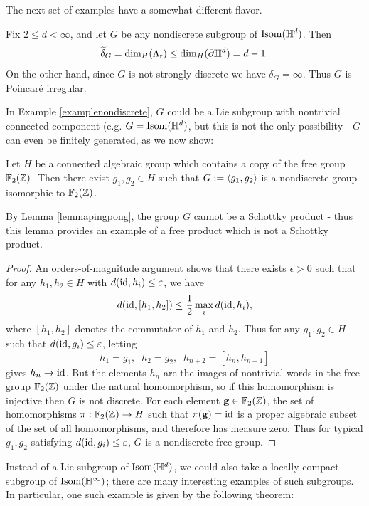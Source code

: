 The next set of examples have a somewhat different flavor.

\begin{example}
\label{examplenondiscrete}
Fix $2\leq d < \infty$, and let $G$ be any nondiscrete subgroup of $\Isom(\H^d)$. Then 
\[
\w\delta_G = \HD(\Lr) \leq \HD(\del\H^d) = d - 1.
\] 
On the other hand, since $G$ is not strongly discrete we have $\delta_G = \infty$. Thus $G$ is Poincar\'e irregular.
\end{example}

In Example \ref{examplenondiscrete}, $G$ could be a Lie subgroup with nontrivial connected component (e.g. $G = \Isom(\H^d)$, but this is not the only possibility - $G$ can even be finitely generated, as we now show:

\begin{lemma}
\label{lemmafreenotschottky}
Let $H$ be a connected algebraic group which contains a copy of the free group $\F_2(\Z)$. Then there exist $g_1,g_2\in H$ such that $G := \langle g_1,g_2\rangle$ is a nondiscrete group isomorphic to $\F_2(\Z)$.
\end{lemma}
By Lemma \ref{lemmapingpong}, the group $G$ cannot be a Schottky product - thus this lemma provides an example of a free product which is not a Schottky product.
\begin{proof}
An orders-of-magnitude argument shows that there exists $\epsilon > 0$ such that for any $h_1,h_2\in H$ with $d(\mathrm{id},h_i)\leq \varepsilon$, we have $$d(\mathrm{id},[h_1,h_2]) \leq \frac12\max_i d(\mathrm{id},h_i),$$ where $[h_1,h_2]$ denotes the commutator of $h_1$ and $h_2$. Thus for any $g_1,g_2\in H$ such that $d(\mathrm{id},g_i)\leq \varepsilon$, letting
\[
h_1 = g_1, \;\; h_2 = g_2, \;\; h_{n + 2} = [h_n,h_{n + 1}]
\]
gives $h_n\to\mathrm{id}$. But the elements $h_n$ are the images of nontrivial words in the free group $\F_2(\Z)$ under the natural homomorphism, so if this homomorphism is injective then $G$ is not discrete. For each element $\gg\in \F_2(\Z)$, the set of homomorphisms $\pi:\F_2(\Z)\to H$ such that $\pi(\mathbf g) = \mathrm{id}$ is a proper algebraic subset of the set of all homomorphisms, and therefore has measure zero. Thus for typical $g_1,g_2$ satisfying $d(\mathrm{id},g_i)\leq \varepsilon$, $G$ is a nondiscrete free group.
\end{proof}

Instead of a Lie subgroup of $\Isom(\H^d)$, we could also take a locally compact subgroup of $\Isom(\H^\infty)$; there are many interesting examples of such subgroups. In particular, one such example is given by the following theorem:

